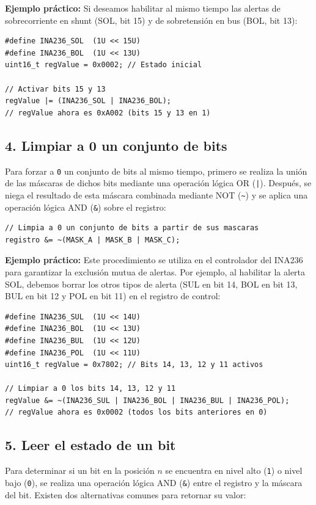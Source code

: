 \documentclass[
10pt, %
a4paper, %
oneside, %
headinclude,footinclude, %
BCOR5mm, %
]{scrartcl}
\begin{document}
\textbf{Ejemplo práctico:}
Si deseamos habilitar al mismo tiempo las alertas de sobrecorriente en shunt (SOL, bit 15) y de sobretensión en bus (BOL, bit 13):
\begin{lstlisting}[style=CMakeStyle]
#define INA236_SOL  (1U << 15U)
#define INA236_BOL  (1U << 13U)
uint16_t regValue = 0x0002; // Estado inicial

// Activar bits 15 y 13
regValue |= (INA236_SOL | INA236_BOL);
// regValue ahora es 0xA002 (bits 15 y 13 en 1)
\end{lstlisting}

\subsection*{4. Limpiar a 0 un conjunto de bits}
Para forzar a \texttt{0} un conjunto de bits al mismo tiempo, primero se realiza la unión de las máscaras de dichos bits mediante una operación lógica OR (\texttt{|}). Después, se niega el resultado de esta máscara combinada mediante NOT (\texttt{\~{}}) y se aplica una operación lógica AND (\texttt{\&}) sobre el registro:
\begin{lstlisting}[style=CMakeStyle]
// Limpia a 0 un conjunto de bits a partir de sus mascaras
registro &= ~(MASK_A | MASK_B | MASK_C);
\end{lstlisting}

\textbf{Ejemplo práctico:}
Este procedimiento se utiliza en el controlador del INA236 para garantizar la exclusión mutua de alertas. Por ejemplo, al habilitar la alerta SOL, debemos borrar los otros tipos de alerta (SUL en bit 14, BOL en bit 13, BUL en bit 12 y POL en bit 11) en el registro de control:
\begin{lstlisting}[style=CMakeStyle]
#define INA236_SUL  (1U << 14U)
#define INA236_BOL  (1U << 13U)
#define INA236_BUL  (1U << 12U)
#define INA236_POL  (1U << 11U)
uint16_t regValue = 0x7802; // Bits 14, 13, 12 y 11 activos

// Limpiar a 0 los bits 14, 13, 12 y 11
regValue &= ~(INA236_SUL | INA236_BOL | INA236_BUL | INA236_POL);
// regValue ahora es 0x0002 (todos los bits anteriores en 0)
\end{lstlisting}

\subsection*{5. Leer el estado de un bit}
Para determinar si un bit en la posición $n$ se encuentra en nivel alto (\texttt{1}) o nivel bajo (\texttt{0}), se realiza una operación lógica AND (\texttt{\&}) entre el registro y la máscara del bit. Existen dos alternativas comunes para retornar su valor:
\end{document}
